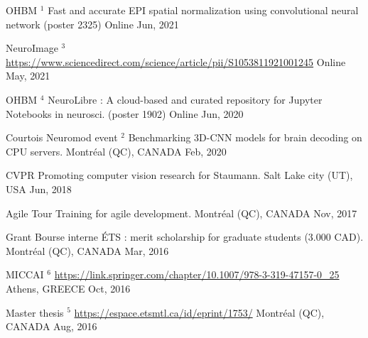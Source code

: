 


\begin{cvhonors}
	
\cvhonor
{OHBM} %
{${^1}$ \label{award:1} Fast and accurate EPI spatial normalization using convolutional neural network (poster 2325)} %
{Online} %
{Jun, 2021}

\cvhonor
{NeuroImage} %
{${^3}$ \label{award:3} \url{https://www.sciencedirect.com/science/article/pii/S1053811921001245}} %
{Online} %
{May, 2021}

\cvhonor
{OHBM} %
{${^4}$ \label{award:4} NeuroLibre : A cloud-based and curated repository for Jupyter Notebooks in neurosci. (poster 1902)} %
{Online} %
{Jun, 2020}

\cvhonor
{Courtois Neuromod event} %
{${^2}$ \label{award:2} Benchmarking 3D-CNN models for brain decoding on CPU servers.} %
{\hspace{-5mm}Montréal (QC), CANADA} %
{Feb, 2020}

\cvhonor
{CVPR} %
{Promoting computer vision research for Staumann.} %
{\hspace{-5mm}Salt Lake city (UT), USA} %
{Jun, 2018} %

\cvhonor
{Agile Tour} %
{Training for agile development.} %
{\hspace{-5mm}Montréal (QC), CANADA} %
{Nov, 2017} %

\cvhonor
{Grant} %
{Bourse interne ÉTS : merit scholarship for graduate students (3.000 CAD).} %
{\hspace{-5mm}Montréal (QC), CANADA} %
{Mar, 2016} %

\cvhonor
{MICCAI} %
{$^6$ \label{award:6} \url{https://link.springer.com/chapter/10.1007/978-3-319-47157-0_25}} %
{Athens, GREECE} %
{Oct, 2016} %

\cvhonor
{Master thesis} %
{$^5$ \label{award:5} \url{https://espace.etsmtl.ca/id/eprint/1753/}} %
{\hspace{-5mm}Montréal (QC), CANADA} %
{Aug, 2016} %


\end{cvhonors}
